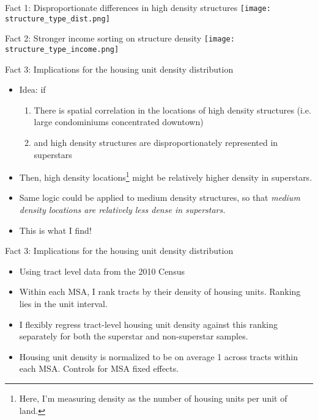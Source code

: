 \documentclass{beamer}
\theoremstyle{plain}
\begin{document}
\begin{frame}{Fact 1: Disproportionate differences in high density structures}
 \texttt{[image: structure\_type\_dist.png]}
\end{frame}

\begin{frame}{Fact 2: Stronger income sorting on structure density}
\texttt{[image: structure\_type\_income.png]}
\end{frame}

\begin{frame}{Fact 3: Implications for the housing unit density distribution}
\begin{itemize}
	\color{black}
	\item Idea: if
	\begin{enumerate}
		\item There is spatial correlation in the locations of high density structures (i.e. large condominiums concentrated downtown) \pause
		\item and high density structures are disproportionately represented in superstars
	\end{enumerate}
\item Then, high density locations\footnote{Here, I'm measuring density as the number of housing units per unit of land.} might be relatively higher density in superstars. 
\item Same logic could be applied to \color{red} medium \color{black} density structures, so that \textit{\color{red} medium \color{black} density locations are relatively less dense in superstars.}
\item This is what I find!
\end{itemize}
\end{frame}

\begin{frame}{Fact 3: Implications for the housing unit density distribution}
\begin{itemize}
	\color{black}
	\item Using tract level data from the 2010 Census \pause
	\item Within each MSA, I rank tracts by their density of housing units. Ranking lies in the unit interval. \pause
	\item I flexibly regress tract-level housing unit density against this ranking separately for both the superstar and non-superstar samples. \pause
	\item Housing unit density is \color{red} normalized to be on average 1 \color{black} across tracts within each MSA. Controls for MSA fixed effects. 
\end{itemize}
\end{frame}
\end{document}

